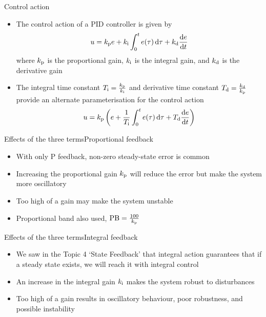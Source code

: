 \documentclass[10pt]{beamer-control}
\begin{document}
\begin{frame}{Control action}
\begin{itemize}
	\item The control action of a PID controller is given by
	\begin{equation}
		u=k_{\mathrm{p}} e+k_{\mathrm{i}} \int_0^t e(\tau) \, \mathrm{d} \tau+k_{\mathrm{d}} \frac{\mathrm{d} e}{\mathrm{d} t}
	\end{equation}
	where $k_{\mathrm{p}}$ is the proportional gain, $k_{\mathrm{i}}$ is the integral gain, and $k_{\mathrm{d}}$ is the derivative gain
	\item The integral time constant $T_{\mathrm{i}}=\tfrac{k_{\mathrm{p}}}{k_{\mathrm{i}}}$ and derivative time constant $T_{\mathrm{d}} = \tfrac{k_{\mathrm{d}}}{k_{\mathrm{p}}}$ provide an alternate parameterisation for the control action
	\begin{equation}
		u = k_{\mathrm{p}}\left(e+\frac{1}{T_{\mathrm{i}}} \int_0^t e(\tau) \, \mathrm{d} \tau+T_{\mathrm{d}} \frac{\mathrm{d} e}{\mathrm{d} t}\right)
	\end{equation}
\end{itemize}

\end{frame}




\begin{frame}{Effects of the three terms}{Proportional feedback}
\begin{itemize}
\item With only P feedback, non-zero steady-state error is common
\item Increasing the proportional gain $k_{\mathrm{p}}$ will reduce the error but make the system more oscillatory
\item Too high of a gain may make the system unstable 
\item Proportional band also used, $\mathrm{PB}=\tfrac{100}{k_{\mathrm{p}}}$
\end{itemize}
\end{frame}

\begin{frame}{Effects of the three terms}{Integral feedback}
\begin{itemize}
	\item We saw in the Topic 4 `State Feedback' that integral action guarantees that if a steady state exists, we will reach it with integral control
	\item An increase in the integral gain $k_{\mathrm{i}}$ makes the system robust to disturbances
	\item Too high of a gain results in oscillatory behaviour, poor robustness, and possible instability
\end{itemize}
\end{frame}
\end{document}
